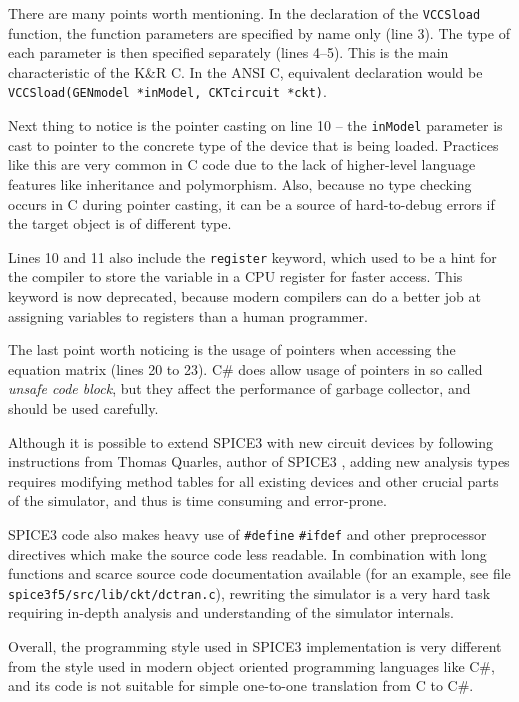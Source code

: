 There are many points worth mentioning. In the declaration of the \texttt{VCCSload} function, the function parameters are specified by name only (line 3). The type of each parameter is then specified separately (lines 4--5). This is the main characteristic of the K\&R C. In the ANSI C, equivalent declaration would be \texttt{VCCSload(GENmodel *inModel, CKTcircuit *ckt)}.

Next thing to notice is the pointer casting on line 10 -- the \texttt{inModel} parameter is cast to pointer to the concrete type of the device that is being loaded. Practices like this are very common in C code due to the lack of higher-level language features like inheritance and polymorphism. Also, because no type checking occurs in C during pointer casting, it can be a source of hard-to-debug errors if the target object is of different type.

Lines 10 and 11 also include the \texttt{register} keyword, which used to be a hint for the compiler to store the variable in a CPU register for faster access. This keyword is now deprecated, because modern compilers can do a better job at assigning variables to registers than a human programmer.

The last point worth noticing is the usage of pointers when accessing the equation matrix (lines 20 to 23). C\# does allow usage of pointers in so called \textit{unsafe code block}, but they affect the performance of garbage collector, and should be used carefully.

Although it is possible to extend SPICE3 with new circuit devices by following instructions from Thomas Quarles, author of SPICE3 \cite{Quarles:M89/45}, adding new analysis types requires modifying method tables for all existing devices and other crucial parts of the simulator, and thus is time consuming and error-prone.

SPICE3 code also makes heavy use of \texttt{\#define} \texttt{\#ifdef} and other preprocessor directives which make the source code less readable. In combination with long functions and scarce source code documentation available (for an example, see file \texttt{spice3f5/src/lib/ckt/dctran.c}), rewriting the simulator is a very hard task requiring in-depth analysis and understanding of the simulator internals.

Overall, the programming style used in SPICE3 implementation is very different from the style used in modern object oriented programming languages like C\#, and its code is not suitable for simple one-to-one translation from C to C\#.

